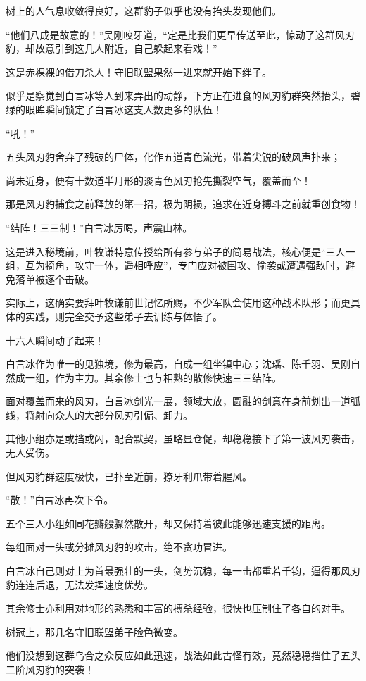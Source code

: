 树上的人气息收敛得良好，这群豹子似乎也没有抬头发现他们。

“他们八成是故意的！”吴刚咬牙道，“定是比我们更早传送至此，惊动了这群风刃豹，却故意引到这几人附近，自己躲起来看戏！”

这是赤裸裸的借刀杀人！守旧联盟果然一进来就开始下绊子。

似乎是察觉到白言冰等人到来弄出的动静，下方正在进食的风刃豹群突然抬头，碧绿的眼眸瞬间锁定了白言冰这支人数更多的队伍！

“吼！”

五头风刃豹舍弃了残破的尸体，化作五道青色流光，带着尖锐的破风声扑来；

尚未近身，便有十数道半月形的淡青色风刃抢先撕裂空气，覆盖而至！

那是风刃豹捕食之前释放的第一招，极为阴损，追求在近身搏斗之前就重创食物！

“结阵！三三制！”白言冰厉喝，声震山林。

这是进入秘境前，叶牧谦特意传授给所有参与弟子的简易战法，核心便是“三人一组，互为犄角，攻守一体，遥相呼应”，专门应对被围攻、偷袭或遭遇强敌时，避免落单被逐个击破。

实际上，这确实要拜叶牧谦前世记忆所赐，不少军队会使用这种战术队形；而更具体的实践，则完全交予这些弟子去训练与体悟了。

十六人瞬间动了起来！

白言冰作为唯一的见独境，修为最高，自成一组坐镇中心；沈瑶、陈千羽、吴刚自然成一组，作为主力。其余修士也与相熟的散修快速三三结阵。

面对覆盖而来的风刃，白言冰剑光一展，领域大放，圆融的剑意在身前划出一道弧线，将射向众人的大部分风刃引偏、卸力。

其他小组亦是或挡或闪，配合默契，虽略显仓促，却稳稳接下了第一波风刃袭击，无人受伤。

但风刃豹群速度极快，已扑至近前，獠牙利爪带着腥风。

“散！”白言冰再次下令。

五个三人小组如同花瓣般骤然散开，却又保持着彼此能够迅速支援的距离。

每组面对一头或分摊风刃豹的攻击，绝不贪功冒进。

白言冰自己则对上为首最强壮的一头，剑势沉稳，每一击都重若千钧，逼得那风刃豹连连后退，无法发挥速度优势。

其余修士亦利用对地形的熟悉和丰富的搏杀经验，很快也压制住了各自的对手。

树冠上，那几名守旧联盟弟子脸色微变。

他们没想到这群乌合之众反应如此迅速，战法如此古怪有效，竟然稳稳挡住了五头二阶风刃豹的突袭！

